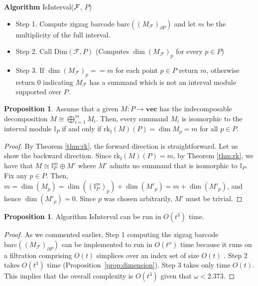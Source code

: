 \documentclass[11pt]{article}
\theoremstyle{definition}
\newtheorem{proposition}[theorem]{Proposition}
\newcommand{\intrk}{\mathrm{rk}_{\mathbb{I}}}
\newcommand{\I}{\mathbb{I}}
\newcommand{\Pb}{P}
\newcommand{\vect}{\mathbf{vec}}
\newcommand{\Fcal}{\mathcal{F}}
\newcommand{\NN}{t}
\newcommand{\barc}{\mathrm{barc}}
\begin{document}
\noindent
{\bf Algorithm} {\sc IsInterval}($\cal F$, $\Pb$)
\begin{itemize}
    \item Step 1. Compute zigzag barcode $\barc((M_{\mathcal F})_{\partial \Pb})$ 
    and let $m$ be the multiplicity of the full interval.
    \item Step 2. Call {\sc Dim}$({\mathcal F},\Pb)$ (Computes $\dim (M_{\mathcal F})_p$ for every $p\in \Pb$)
    \item Step 3. If $\dim (M_{\mathcal F})_p==m$ for each point $p\in \Pb$ return $m$, otherwise return $0$ indicating $M_{\mathcal F}$ has a summand which is not an interval
    module supported over $\Pb$.
\end{itemize}

\begin{proposition}
Assume that a given $M:\Pb\rightarrow \vect$ has the indecomposable decomposition $M\cong\bigoplus_{i=1}^m M_i$. Then, every summand $M_i$ is isomorphic to the interval module $\I_{\Pb}$  if and only if $\intrk(M)(\Pb)=\dim M_p=m$ for all $p\in \Pb$.
\label{prop:IsInterval}
\end{proposition}

\begin{proof}By Theorem \ref{thm:rk}, the forward direction is straightforward. Let us show the backward direction. Since $\intrk(M)(\Pb)=m$, by Theorem \ref{thm:rk}, we have that 
$M\cong \I_{\Pb}^m \oplus M'$ 
where $M'$ admits no summand that is isomorphic to $\I_\Pb$. Fix any $p\in \Pb$. Then, $m=\dim(M_p)=\dim ((\I_{\Pb}^m )_p)+\dim(M'_p)=m+\dim(M'_p)$, and hence $\dim(M'_p)=0$. Since $p$ was chosen arbitrarily, $M'$ must be trivial.
\end{proof}




\begin{proposition}\label{prop:IsInverval complexity}
Algorithm {\sc IsInterval} can be run in $O(\NN^3)$ time. 
\end{proposition}

\begin{proof}
As we commented earlier, Step 1 computing the  zigzag barcode $\barc((M_{\Fcal})_{\partial \Pb})$ can be implemented to run in $O(\NN^\omega)$ time because
it runs on a filtration comprising $O(\NN)$ simplices over an index set of size $O(\NN)$ . 
Step 2 takes $O(\NN^3)$ time (Proposition~\ref{prop:dimension}).
Step 3 takes only time $O(\NN)$. 
This implies that the overall complexity is $O(\NN^3)$ given that $\omega<2.373$.
\end{proof}
\end{document}
